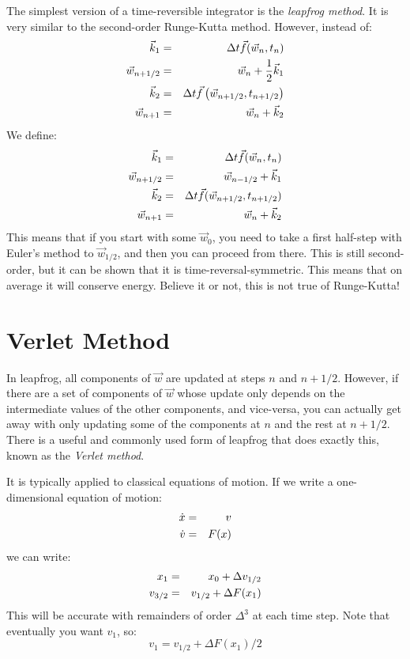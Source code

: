 The simplest version of a time-reversible integrator is the {\it leapfrog
  method}. It is very similar to the second-order Runge-Kutta method. 
However, instead of:
\begin{eqnarray}
\vec{k}_1 &=& \Delta t \vec{f}(\vec{w}_n, t_n) \cr
\vec{w}_{n+1/2} &=& \vec{w}_n + \frac{1}{2}\vec{k}_1 \cr
\vec{k}_2 &=& \Delta t \vec{f}\left(\vec{w}_{n+1/2}, t_{n+1/2}\right) \cr
\vec{w}_{n+1} &=& \vec{w}_n + \vec{k}_2
\end{eqnarray}
We define:
\begin{eqnarray}
\vec{k}_1 &=& \Delta t \vec{f}(\vec{w}_n, t_n) \cr
\vec{w}_{n+1/2} &=& \vec{w}_{n-1/2} + \vec{k}_1 \cr
\vec{k}_2 &=& \Delta t \vec{f}(\vec{w}_{n+1/2}, t_{n+1/2}) \cr
\vec{w}_{n+1} &=& \vec{w}_{n} + \vec{k}_2
\end{eqnarray}
This means that if you start with some $\vec{w}_0$, you need to take a
first half-step with Euler's method to $\vec{w}_{1/2}$, and then you
can proceed from there. This is still second-order, but it can be
shown that it is time-reversal-symmetric. This means that on average
it will conserve energy. Believe it or not, this is not true of
Runge-Kutta!

\section{Verlet Method}

In leapfrog, all components of $\vec{w}$ are updated at steps $n$ and
$n+1/2$. However, if there are a set of components of $\vec{w}$ whose
update only depends on the intermediate values of the other
components, and vice-versa, you can actually get away with only
updating some of the components at $n$ and the rest at $n+1/2$. There
is a useful and commonly used form of leapfrog that does exactly this,
known as the {\it Verlet method}.

It is typically applied to classical equations of motion. If we write
a one-dimensional equation of motion:
\begin{eqnarray}
{\dot x} &=& v \cr
{\dot v} &=& F(x)
\end{eqnarray}
we can write: 
\begin{eqnarray}
x_1 &=& x_0 + \Delta v_{1/2} \cr
v_{3/2} &=& v_{1/2} + \Delta F(x_1)
\end{eqnarray}
This will be accurate with remainders of order $\Delta^3$ at each time
step. Note that eventually you want $v_1$, so:
\begin{equation}
v_{1} = v_{1/2} + \Delta F(x_1) / 2
\end{equation}

